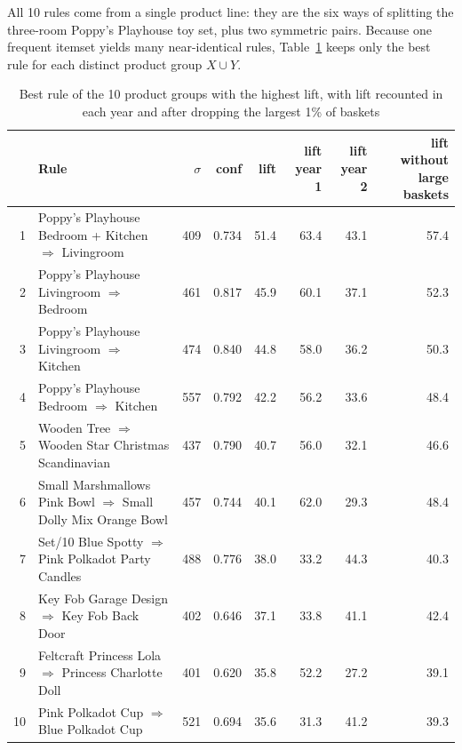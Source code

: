 All 10 rules come from a single product line: they are the six ways of splitting the
three-room Poppy's Playhouse toy set, plus two symmetric pairs. Because one frequent
itemset yields many near-identical rules, Table~\ref{tab:top-groups} keeps only the best
rule for each distinct product group $X \cup Y$.

\begin{table}[t]
\centering
\caption{Best rule of the 10 product groups with the highest lift, with lift recounted in
each year and after dropping the largest 1\% of baskets}
\label{tab:top-groups}
\begin{tabular}{rlrrrrrr}
\hline
 & Rule & $\sigma$ & conf & lift & lift year 1 & lift year 2 & lift without large baskets \\
\hline
1 & Poppy's Playhouse Bedroom + Kitchen $\Rightarrow$ Livingroom & 409 & 0.734 & 51.4 & 63.4 & 43.1 & 57.4 \\
2 & Poppy's Playhouse Livingroom $\Rightarrow$ Bedroom & 461 & 0.817 & 45.9 & 60.1 & 37.1 & 52.3 \\
3 & Poppy's Playhouse Livingroom $\Rightarrow$ Kitchen & 474 & 0.840 & 44.8 & 58.0 & 36.2 & 50.3 \\
4 & Poppy's Playhouse Bedroom $\Rightarrow$ Kitchen & 557 & 0.792 & 42.2 & 56.2 & 33.6 & 48.4 \\
5 & Wooden Tree $\Rightarrow$ Wooden Star Christmas Scandinavian & 437 & 0.790 & 40.7 & 56.0 & 32.1 & 46.6 \\
6 & Small Marshmallows Pink Bowl $\Rightarrow$ Small Dolly Mix Orange Bowl & 457 & 0.744 & 40.1 & 62.0 & 29.3 & 48.4 \\
7 & Set/10 Blue Spotty $\Rightarrow$ Pink Polkadot Party Candles & 488 & 0.776 & 38.0 & 33.2 & 44.3 & 40.3 \\
8 & Key Fob Garage Design $\Rightarrow$ Key Fob Back Door & 402 & 0.646 & 37.1 & 33.8 & 41.1 & 42.4 \\
9 & Feltcraft Princess Lola $\Rightarrow$ Princess Charlotte Doll & 401 & 0.620 & 35.8 & 52.2 & 27.2 & 39.1 \\
10 & Pink Polkadot Cup $\Rightarrow$ Blue Polkadot Cup & 521 & 0.694 & 35.6 & 31.3 & 41.2 & 39.3 \\
\hline
\end{tabular}
\end{table}

